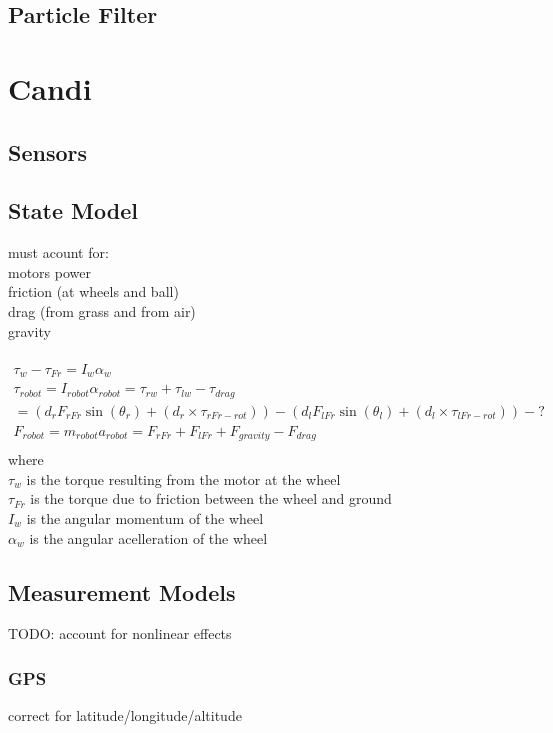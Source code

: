 \documentclass[a4paper,10pt]{report}
\begin{document}
\section{Particle Filter}

\chapter{Candi}
\section{Sensors}

\section{State Model}
must acount for: \\
motors power \\
friction (at wheels and ball) \\
drag (from grass and from air) \\
gravity \\
\\
\begin{gather*}
\tau _{w} - \tau _{Fr} = I_{w} \alpha _{w} \\
\tau _{robot} = I_{robot} \alpha _{robot} = \tau _{rw} + \tau _{lw} - \tau _{drag} \\
= (d_{r} F_{rFr} \sin (\theta _{r}) + (d_{r} \times \tau _{rFr-rot})) - (d_{l} F_{lFr} \sin (\theta _{l}) + (d_{l} \times \tau _{lFr-rot})) - ? \\
F_{robot} = m_{robot} a_{robot} = F_{rFr} + F_{lFr} + F_{gravity} - F_{drag} \\
\end{gather*}
where \\
$\tau _{w}$ is the torque resulting from the motor at the wheel \\
$\tau _{Fr}$ is the torque due to friction between the wheel and ground \\
$I_{w}$ is the angular momentum of the wheel \\
$\alpha _{w}$ is the angular acelleration of the wheel \\

\section{Measurement Models}
TODO: account for nonlinear effects
\subsection{GPS}
correct for latitude/longitude/altitude
\end{document}
